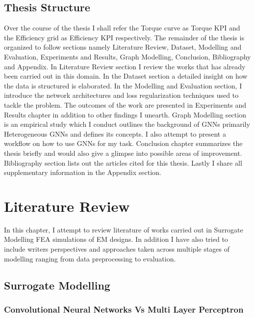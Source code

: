 \documentclass{report} %
\begin{document}
\section{Thesis Structure}\label{sec:Thesis Structure}

Over the course of the thesis I shall refer the Torque curve as Torque \ac{KPI} and the Efficiency grid as Efficiency \ac{KPI} respectively.
The remainder of the thesis is organized to follow sections namely Literature Review, Dataset, Modelling and Evaluation, Experiments and Results, Graph Modelling, Conclusion, 
Bibliography and Appendix.
In Literature Review section I review the works that has already been carried out in this domain. 
In the Dataset section a detailed insight on how the data is structured is elaborated.
In the Modelling and Evaluation section, I introduce the network architectures and loss regularization techniques used to tackle the problem.
The outcomes of the work are presented in Experiments and Results chapter in addition to other findings I unearth.
Graph Modelling section is an empirical study which I conduct outlines the background of \ac{GNN}s primarily Heterogeneous \ac{GNN}s and defines its concepts. I also attempt to 
present a workflow on how to use \ac{GNN}s for my task.
Conclusion chapter summarizes the thesis briefly and would also give a glimpse into possible areas of improvement. 
Bibliography section lists out the articles cited for this thesis. 
Lastly I share all supplementary information in the Appendix section.

\chapter{Literature Review} 

In this chapter, I attempt to review literature of works carried out in Surrogate Modelling \ac{FEA} simulations of \ac{EM} designs. In addition I have also tried to include 
writers perspectives and approaches taken across multiple stages of modelling ranging from data preprocessing to evaluation.

\section{Surrogate Modelling}\label{sec:Surrogate Modelling}

\subsection{Convolutional Neural Networks Vs Multi Layer Perceptron}\label{subsec:LR CNN Vs MLP}
\end{document}
